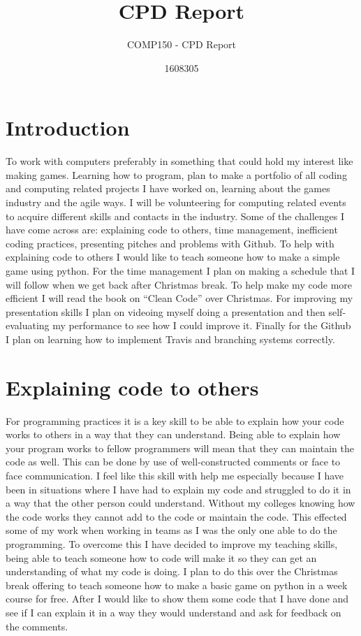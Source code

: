 \documentclass{scrartcl}
\title{CPD Report}
\subtitle{COMP150 - CPD Report}
\author{1608305}
\begin{document}
\maketitle

\section{Introduction}

To work with computers preferably in something that could hold my interest like making games.
Learning how to program, plan to make a portfolio of all coding and computing related projects I have worked on, learning about the games industry and the agile ways. I will be volunteering for computing related events to acquire different skills and contacts in the industry.
Some of the challenges I have come across are: explaining code to others, time management, inefficient coding practices, presenting pitches and problems with Github.
To help with explaining code to others I would like to teach someone how to make a simple game using python. For the time management I plan on making a schedule that I will follow when we get back after Christmas break. To help make my code more efficient I will read the book on “Clean Code” over Christmas. For improving my presentation skills I plan on videoing myself doing a presentation and then self-evaluating my performance to see how I could improve it. Finally for the Github I plan on learning how to implement Travis and branching systems correctly.



\section{Explaining code to others}

For programming practices it is a key skill to be able to explain how your code works to others in a way that they can understand. Being able to explain how your program works to fellow programmers will mean that they can maintain the code as well. This can be done by use of well-constructed comments or face to face communication. I feel like this skill with help me especially because I have been in situations where I have had to explain my code and struggled to do it in a way that the other person could understand. Without my colleges knowing how the code works they cannot add to the code or maintain the code. This effected some of my work when working in teams as I was the only one able to do the programming. To overcome this I have decided to improve my teaching skills, being able to teach someone how to code will make it so they can get an understanding of what my code is doing. I plan to do this over the Christmas break offering to teach someone how to make a basic game on python in a week course for free. After I would like to show them some code that I have done and see if I can explain it in a way they would understand and ask for feedback on the comments.
\end{document}
